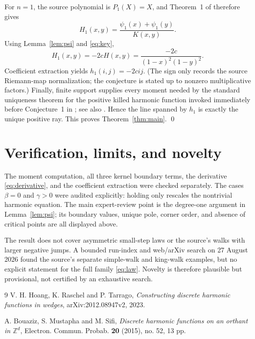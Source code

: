 \documentclass[10pt]{article}
\begin{document}
For $n=1$, the source polynomial is $P_1(X)=X$, and Theorem~1 of \cite{HRT}
therefore gives
\[
 H_1(x,y)=\frac{\psi_1(x)+\psi_1(y)}{K(x,y)}.
\]
Using Lemma~\ref{lem:psi} and \eqref{eq:key},
\[
 H_1(x,y)=-2cH(x,y)
 =\frac{-2c}{(1-x)^2(1-y)^2}.
\]
Coefficient extraction yields $h_1(i,j)=-2cij$.  (The sign only records the
source Riemann-map normalization; the conjecture is stated up to nonzero
multiplicative factors.)  Finally, finite support supplies every moment needed
by the standard uniqueness theorem for the positive killed harmonic function
invoked immediately before Conjecture~1 in \cite{HRT}; see also
\cite{BMS}.  Hence the line spanned by $h_1$ is exactly the unique positive
ray.  This proves Theorem~\ref{thm:main}. \qed

\section*{Verification, limits, and novelty}

The moment computation, all three kernel boundary terms, the derivative
\eqref{eq:derivative}, and the coefficient extraction were checked separately.
The cases $\beta=0$ and $\gamma>0$ were audited explicitly: holding only
rescales the nontrivial harmonic equation.  The main expert-review point is
the degree-one argument in Lemma~\ref{lem:psi}; its boundary values, unique
pole, corner order, and absence of critical points are all displayed above.

The result does not cover asymmetric small-step laws or the source's walks
with larger negative jumps.  A bounded run-index and web/arXiv search on
27 August 2026 found the source's separate simple-walk and king-walk examples,
but no explicit statement for the full family \eqref{eq:law}.  Novelty is
therefore plausible but provisional, not certified by an exhaustive search.

\begin{thebibliography}{9}
V. H. Hoang, K. Raschel and P. Tarrago,
\emph{Constructing discrete harmonic functions in wedges},
arXiv:2012.08947v2, 2023.

A. Bouaziz, S. Mustapha and M. Sifi,
\emph{Discrete harmonic functions on an orthant in $\mathbb Z^d$},
Electron. Commun. Probab. \textbf{20} (2015), no. 52, 13 pp.
\end{thebibliography}
\end{document}

